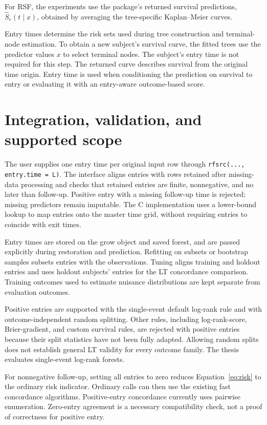 For RSF, the experiments use the package's returned survival predictions,
$\widehat S_e(t\mid x)$, obtained by averaging the tree-specific
Kaplan--Meier curves.

Entry times determine the risk sets used during tree construction and
terminal-node estimation. To obtain a new subject's survival curve,
the fitted trees use the predictor values $x$ to select terminal nodes.
The subject's entry time is not required for this step. The returned
curve describes survival from the original time origin. Entry time is
used when conditioning the prediction on survival to entry or evaluating
it with an entry-aware outcome-based score.

\section{Integration, validation, and supported scope}
The user supplies one entry time per original input row through
\texttt{rfsrc(..., entry.time = L)}. The interface aligns entries with rows
retained after missing-data processing and checks that retained entries are
finite, nonnegative, and no later than follow-up. Positive entry with a
missing follow-up time is rejected; missing predictors remain imputable.
The C implementation uses a lower-bound lookup to map entries onto the
master time grid, without requiring entries to coincide with exit times.

Entry times are stored on the grow object and saved forest, and are passed
explicitly during restoration and prediction. Refitting on subsets or
bootstrap samples subsets entries with the observations. Tuning aligns
training and holdout entries and uses holdout subjects' entries for the LT
concordance comparison. Training outcomes used to estimate nuisance
distributions are kept separate from evaluation outcomes.

Positive entries are supported with the single-event default log-rank rule
and with outcome-independent random splitting. Other rules, including
log-rank-score, Brier-gradient, and custom survival rules, are rejected with
positive entries because their split statistics have not been fully adapted.
Allowing random splits does not establish general LT validity for every
outcome family. The thesis evaluates single-event log-rank forests.

For nonnegative follow-up, setting all entries to zero reduces
Equation~\eqref{eq:risk} to the ordinary risk indicator. Ordinary calls can
then use the existing fast concordance algorithms. Positive-entry
concordance currently uses pairwise enumeration. Zero-entry agreement is a
necessary compatibility check, not a proof of correctness for positive entry.

